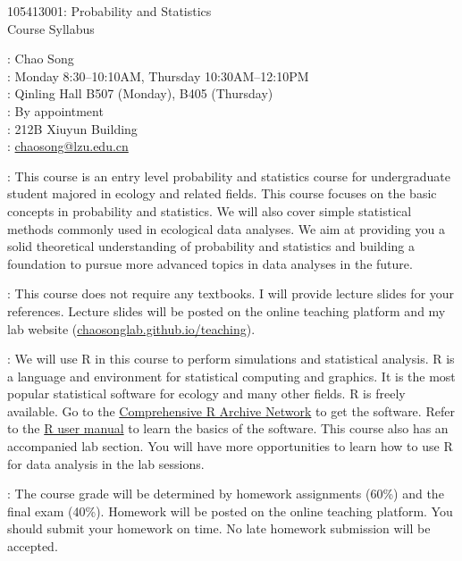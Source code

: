 \documentclass[12pt]{article}
\begin{document}
\begin{center}
{\Large 105413001: Probability and Statistics \\[4pt] Course Syllabus}\\
\end{center}
\bigskip

: Chao Song\\
: Monday 8:30--10:10AM, Thursday 10:30AM--12:10PM\\
: Qinling Hall B507 (Monday), B405 (Thursday)\\
: By appointment\\
: 212B Xiuyun Building\\
: \href{mailto:chaosong@lzu.edu.cn}{chaosong@lzu.edu.cn}
\medskip

:
This course is an entry level probability and statistics course for undergraduate student majored in ecology and related fields. This course focuses on the basic concepts in probability and statistics. We will also cover simple statistical methods commonly used in ecological data analyses. We aim at providing you a solid theoretical understanding of probability and statistics and building a foundation to pursue more advanced topics in data analyses in the future. 
\medskip

:
This course does not require any textbooks. I will provide lecture slides for your references. Lecture slides will be posted on the online teaching platform and my lab website (\href{https://chaosonglab.github.io/teaching}{chaosonglab.github.io/teaching}). 
\medskip

:
We will use R in this course to perform simulations and statistical analysis. R is a language and environment for statistical computing and graphics. It is the most popular statistical software for ecology and many other fields. R is freely available. Go to the \href{https://cran.r-project.org/index.html}{Comprehensive R Archive Network} to get the software. Refer to the \href{https://cran.r-project.org/doc/manuals/r-release/R-intro.html}{R user manual} to learn the basics of the software. This course also has an accompanied lab section. You will have more opportunities to learn how to use R for data analysis in the lab sessions.
\medskip


:
The course grade will be determined by homework assignments (60\%) and the final exam (40\%). Homework will be posted on the online teaching platform. You should submit your homework on time. No late homework submission will be accepted.
\medskip
\end{document}
